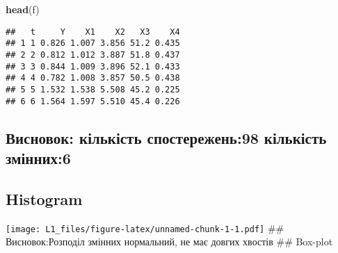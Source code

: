 \documentclass[]{article}
\newenvironment{Shaded}{\begin{snugshade}}{\end{snugshade}}
\newcommand{\KeywordTok}[1]{\textcolor[rgb]{0.13,0.29,0.53}{\textbf{#1}}}
\newcommand{\DataTypeTok}[1]{\textcolor[rgb]{0.13,0.29,0.53}{#1}}
\newcommand{\DecValTok}[1]{\textcolor[rgb]{0.00,0.00,0.81}{#1}}
\newcommand{\StringTok}[1]{\textcolor[rgb]{0.31,0.60,0.02}{#1}}
\newcommand{\OperatorTok}[1]{\textcolor[rgb]{0.81,0.36,0.00}{\textbf{#1}}}
\newcommand{\NormalTok}[1]{#1}
\begin{document}
\begin{Shaded}
\begin{Highlighting}[]
\KeywordTok{head}\NormalTok{(f)}
\end{Highlighting}
\end{Shaded}

\begin{verbatim}
##   t     Y    X1    X2   X3    X4
## 1 1 0.826 1.007 3.856 51.2 0.435
## 2 2 0.812 1.012 3.887 51.8 0.437
## 3 3 0.844 1.009 3.896 52.1 0.433
## 4 4 0.782 1.008 3.857 50.5 0.438
## 5 5 1.532 1.538 5.508 45.2 0.225
## 6 6 1.564 1.597 5.510 45.4 0.226
\end{verbatim}

\subsection{Висновок: кількість спостережень:98 кількість
змінних:6}\label{ux432ux438ux441ux43dux43eux432ux43eux43a-ux43aux456ux43bux44cux43aux456ux441ux442ux44c-ux441ux43fux43eux441ux442ux435ux440ux435ux436ux435ux43dux44c98-ux43aux456ux43bux44cux43aux456ux441ux442ux44c-ux437ux43cux456ux43dux43dux438ux4456}

\subsection{Histogram}\label{histogram}

\begin{Shaded}
\end{Shaded}

\texttt{[image: L1\_files/figure-latex/unnamed-chunk-1-1.pdf]} \#\#
Висновок:Розподіл змінних нормальний, не має довгих хвостів \#\#
Box-plot

\begin{Shaded}
\end{Shaded}
\end{document}

